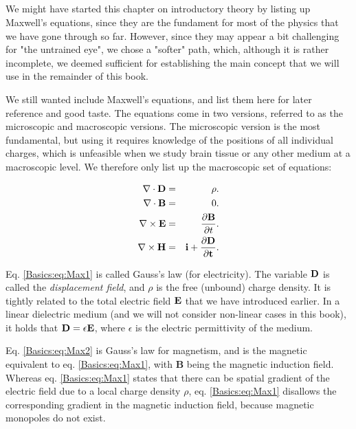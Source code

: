 

\subsection{}
We might have started this chapter on introductory theory by listing up Maxwell's equations, since they are the fundament for most of the physics that we have gone through so far. However, since they may appear a bit challenging for "the untrained eye", we chose a "softer" path, which, although it is rather incomplete, we deemed sufficient for establishing the main concept that we will use in the remainder of this book. 

We still wanted include Maxwell's equations, and list them here for later reference and good taste.
The equations come in two versions, referred to as the microscopic and macroscopic versions. The microscopic version is the most fundamental, but using it requires knowledge of the positions of all individual charges, which is unfeasible when we study brain tissue or any other medium at a macroscopic level. We therefore only list up the macroscopic set of equations: 

\begin{eqnarray}
\nabla\cdot {\bf D} & = & \rho. \label{Basics:eq:Max1} \\
\nabla \cdot {\bf B} & = & 0.  \label{Basics:eq:Max2} \\
\nabla \times {\bf E} & = & \frac{\partial {\bf B}}{\partial t}.  \label{Basics:eq:Max3} \\
\nabla \times {\bf H} & = & \bf{i} + \frac{\partial {\bf D}}{\partial t}.  \label{Basics:eq:Max4}
\label{Basics:eq:Maxwell}
\end{eqnarray}

Eq. \ref{Basics:eq:Max1} is called Gauss's law (for electricity). The variable ${\bf D}$ is called the \textit{displacement field}, and $\rho$ is the free (unbound) charge density. It is tightly related to the total electric field ${\bf E}$ that we have introduced earlier. In a linear dielectric medium (and we will not consider non-linear cases in this book), it holds that ${\bf D} = \epsilon {\bf E}$, where $\epsilon$ is the electric permittivity of the medium. 

Eq. \ref{Basics:eq:Max2} is Gauss's law for magnetism, and is the magnetic equivalent to eq. \ref{Basics:eq:Max1}, with {\bf B} being the magnetic induction field.  Whereas eq. \ref{Basics:eq:Max1} states that there can be spatial gradient of the electric field due to a local charge density $\rho$, eq. \ref{Basics:eq:Max1} disallows the corresponding gradient in the magnetic induction field, because magnetic monopoles do not exist. 

